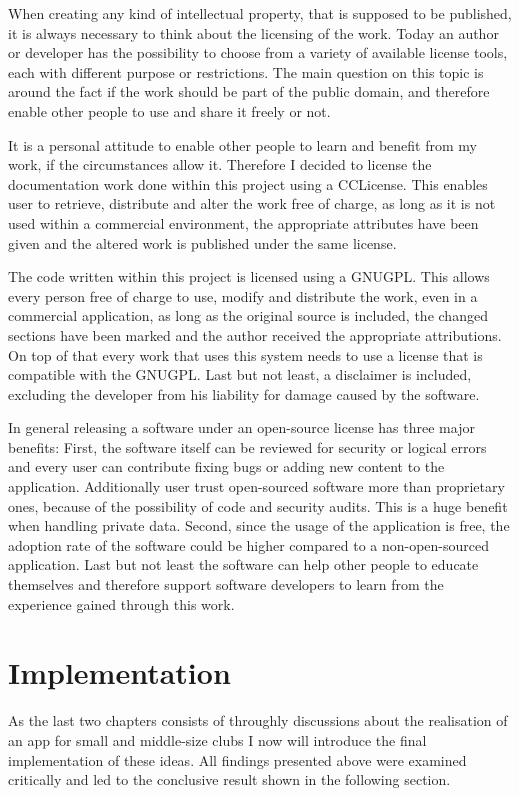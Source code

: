 When creating any kind of intellectual property, that is supposed to be published, it is always necessary to think about the licensing of the work. Today an author or developer has the possibility to choose from a variety of available license tools, each with different purpose or restrictions. The main question on this topic is around the fact if the work should be part of the public domain, and therefore enable other people to use and share it freely or not. 

It is a personal attitude to enable other people to learn and benefit from my work, if the circumstances allow it. Therefore I decided to license the documentation work done within this project using a \gls{CCLicense}. This enables user to retrieve, distribute and alter the work free of charge, as long as it is not used within a commercial environment, the appropriate attributes have been given and the altered work is published under the same license. \cite{Commons:2015aa}

The code written within this project is licensed using a \gls{GNUGPL}. This allows every person free of charge to use, modify and distribute the work, even in a commercial application, as long as the original source is included, the changed sections have been marked and the author received the appropriate attributions. On top of that every work that uses this system needs to use a license that is compatible with the \gls{GNUGPL}. Last but not least, a disclaimer is included, excluding the developer from his liability for damage caused by the software. \cite{Foundation:1991aa}

In general releasing a software under an open-source license has three major benefits: First, the software itself can be reviewed for security or logical errors and every user can contribute fixing bugs or adding new content to the application. Additionally user trust open-sourced software more than proprietary ones, because of the possibility of code and security audits. This is a huge benefit when handling private data. Second, since the usage of the application is free, the adoption rate of the software could be higher compared to a non-open-sourced application. Last but not least the software can help other people to educate themselves and therefore support software developers to learn from the experience gained through this work.

\chapter{Implementation}
\label{chapter:Implementation}
As the last two chapters consists of throughly discussions about the realisation of an app for small and middle-size clubs I now will introduce the final implementation of these ideas. All findings presented above were examined critically and led to the conclusive result shown in the following section.

